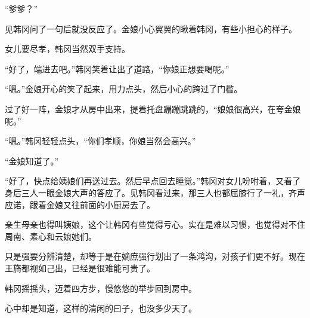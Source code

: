 “爹爹？”

见韩冈问了一句后就没反应了。金娘小心翼翼的瞅着韩冈，有些小担心的样子。

女儿要尽孝，韩冈当然双手支持。

“好了，端进去吧。”韩冈笑着让出了道路，“你娘正想要喝呢。”

“嗯。”金娘开心的笑了起来，用力点头，然后小心的跨过了门槛。

过了好一阵，金娘才从房中出来，提着托盘蹦蹦跳跳的，“娘娘很高兴，在夸金娘呢。”

“嗯。”韩冈轻轻点头，“你们孝顺，你娘当然会高兴。”

“金娘知道了。”

“好了，快点给姨娘们再送过去。然后早点回去睡觉。”韩冈对女儿吩咐着，又看了身后三人一眼金娘大声的答应了。见韩冈看过来，那三人也都屈膝行了一礼，齐声应诺，跟着金娘又往前面的小厨房去了。

亲生母亲也得叫姨娘，这个让韩冈有些觉得亏心。实在是难以习惯，也觉得对不住周南、素心和云娘她们。

只是强要分辨清楚，却等于是在嫡庶强行划出了一条鸿沟，对孩子们更不好。现在王旖都视如己出，已经是很难能可贵了。

韩冈摇摇头，迈着四方步，慢悠悠的举步回到房中。

心中却是知道，这样的清闲的曰子，也没多少天了。

